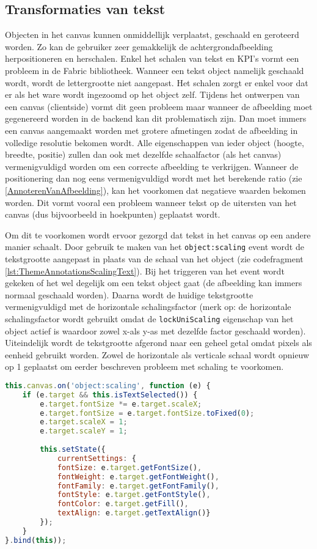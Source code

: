 \subsection{Transformaties van tekst}
Objecten in het canvas kunnen onmiddellijk verplaatst, geschaald en geroteerd worden. Zo kan de gebruiker zeer gemakkelijk de achtergrondafbeelding herpositioneren en herschalen. Enkel het schalen van tekst en KPI's vormt een probleem in de Fabric bibliotheek. Wanneer een tekst object namelijk geschaald wordt, wordt de lettergrootte niet aangepast. Het schalen zorgt er enkel voor dat er als het ware wordt ingezoomd op het object zelf. Tijdens het ontwerpen van een canvas (clientside) vormt dit geen probleem maar wanneer de afbeelding moet gegenereerd worden in de backend kan dit problematisch zijn. Dan moet immers een canvas aangemaakt worden met grotere afmetingen zodat de afbeelding in volledige resolutie bekomen wordt.  Alle eigenschappen van ieder object (hoogte, breedte, positie) zullen dan ook met dezelfde schaalfactor (als het canvas) vermenigvuldigd worden om een correcte afbeelding te verkrijgen. Wanneer de positionering dan nog eens vermenigvuldigd wordt met het berekende ratio (zie \ref{AnnoterenVanAfbeelding}), kan het voorkomen dat negatieve waarden bekomen worden. Dit vormt vooral een probleem wanneer tekst op de uitersten van het canvas (dus bijvoorbeeld in hoekpunten) geplaatst wordt. 

Om dit te voorkomen wordt ervoor gezorgd dat tekst in het canvas op een andere manier schaalt. Door gebruik te maken van het \lstinline{object:scaling} event wordt de tekstgrootte aangepast in plaats van de schaal van het object (zie codefragment \ref{lst:ThemeAnnotationsScalingText}). Bij het triggeren van het event wordt gekeken of het wel degelijk om een tekst object gaat (de afbeelding kan immers normaal geschaald worden). Daarna wordt de huidige tekstgrootte vermenigvuldigd met de horizontale schalingsfactor (merk op: de horizontale schalingsfactor wordt gebruikt omdat de \lstinline{lockUniScaling} eigenschap van het object actief is waardoor zowel x-als y-as met dezelfde factor geschaald worden). Uiteindelijk wordt de tekstgrootte afgerond naar een geheel getal omdat pixels als eenheid gebruikt worden. Zowel de horizontale als verticale schaal wordt opnieuw op 1 geplaatst om eerder beschreven probleem met schaling te voorkomen. 

\begin{lstlisting}[caption={ThemeAnnotations component - text scaling},label=lst:ThemeAnnotationsScalingText,language=javascript]
this.canvas.on('object:scaling', function (e) {
	if (e.target && this.isTextSelected()) {
		e.target.fontSize *= e.target.scaleX;
		e.target.fontSize = e.target.fontSize.toFixed(0);
		e.target.scaleX = 1;
		e.target.scaleY = 1;
		
		this.setState({
			currentSettings: {
			fontSize: e.target.getFontSize(),
			fontWeight: e.target.getFontWeight(),
			fontFamily: e.target.getFontFamily(),
			fontStyle: e.target.getFontStyle(),
			fontColor: e.target.getFill(),
			textAlign: e.target.getTextAlign()}
		});
	}
}.bind(this));
\end{lstlisting}

